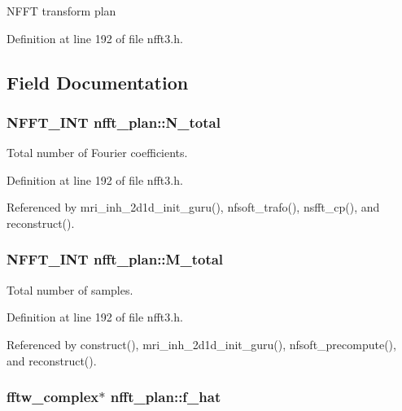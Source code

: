 N\-F\-F\-T transform plan 

Definition at line 192 of file nfft3.\-h.



\subsection{Field Documentation}
\hypertarget{structnfft__plan_a36c570febbf29ba02df8195b634b12bb}{
\subsubsection[{N\-\_\-total}]{\setlength{\rightskip}{0pt plus 5cm}N\-F\-F\-T\-\_\-\-I\-N\-T nfft\-\_\-plan\-::\-N\-\_\-total}}\label{structnfft__plan_a36c570febbf29ba02df8195b634b12bb}


Total number of Fourier coefficients. 



Definition at line 192 of file nfft3.\-h.



Referenced by mri\-\_\-inh\-\_\-2d1d\-\_\-init\-\_\-guru(), nfsoft\-\_\-trafo(), nsfft\-\_\-cp(), and reconstruct().

\hypertarget{structnfft__plan_aa5ccb2e44937aa98e995e2c33828be03}{
\subsubsection[{M\-\_\-total}]{\setlength{\rightskip}{0pt plus 5cm}N\-F\-F\-T\-\_\-\-I\-N\-T nfft\-\_\-plan\-::\-M\-\_\-total}}\label{structnfft__plan_aa5ccb2e44937aa98e995e2c33828be03}


Total number of samples. 



Definition at line 192 of file nfft3.\-h.



Referenced by construct(), mri\-\_\-inh\-\_\-2d1d\-\_\-init\-\_\-guru(), nfsoft\-\_\-precompute(), and reconstruct().

\hypertarget{structnfft__plan_a23409aec68871e9a56f11711e2891691}{
\subsubsection[{f\-\_\-hat}]{\setlength{\rightskip}{0pt plus 5cm}fftw\-\_\-complex$\ast$ nfft\-\_\-plan\-::f\-\_\-hat}}\label{structnfft__plan_a23409aec68871e9a56f11711e2891691}


